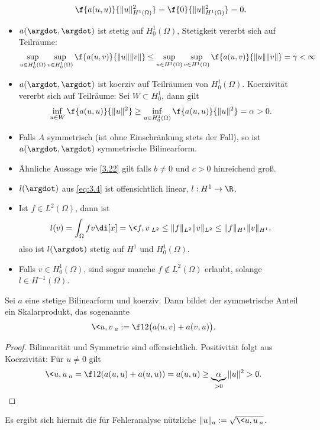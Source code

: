 \begin{st}[Stetigkeit und Koerzivität, $b=0$, $c = 0$]
\begin{note}
\begin{itemize}
				\[
					\f{a(u,u)}{\|u\|_{H^1(\Omega)}^2}
					= \f{0}{\|u\|_{H^1(\Omega)}^2}
					= 0.
				\]
			\item
				$a(\argdot, \argdot)$ ist stetig auf $H_0^1(\Omega)$, Stetigkeit vererbt sich auf Teilräume:
				\begin{align*}
					\sup_{u \in H_0^1(\Omega)} \sup_{v \in H_0^1(\Omega)} \f{a(u,v)}{\|u\|\|v\|}
					\le \sup_{u \in H^1(\Omega)} \sup_{v \in H^1(\Omega)} \f{a(u,v)}{\|u\|\|v\|}
					= \gamma < \infty
				\end{align*}
			\item
				$a(\argdot, \argdot)$ ist koerziv auf Teilräumen von $H_0^1(\Omega)$.
				Koerzivität vererbt sich auf Teilräume:
				Sei $W \subset H_0^1$, dann gilt
				\[
					\inf_{u \in W} \f{a(u,u)}{\|u\|^2}
					\ge \inf_{u \in H_0^1(\Omega)} \f{a(u,u)}{\|u\|^2}
					= \alpha
					> 0.
				\]
			\item
				Falls $A$ symmetrisch (ist ohne Einschränkung stets der Fall), so ist $a(\argdot, \argdot)$ symmetrische Bilinearform.
			\item
				Ähnliche Aussage wie \ref{3.22} gilt falls $b \neq 0$ und $c > 0$ hinreichend groß.
		\end{itemize}
	\end{note}
\end{st}

\begin{note}
	\begin{itemize}
		\item
			$l(\argdot)$ aus \eqref{eq:3.4} ist offensichtlich linear, $l: H^1 \to \R$.
		\item
			Ist $f \in L^2(\Omega)$, dann ist
			\[
				l(v) = \int_\Omega fv \di[x]
				= \<f, v \>_{L^2}
				\le \|f\|_{L^2} \|v\|_{L^2}
				\le \|f\|_{H^1}\|v\|_{H^1},
			\]
			also ist $l(\argdot)$ stetig auf $H^1$ und $H_0^1(\Omega)$.
		\item
			Falls $v \in H_0^1(\Omega)$, sind sogar manche $f \not\in L^2(\Omega)$ erlaubt, solange $l \in H^{-1}(\Omega)$.
	\end{itemize}
\end{note}


\begin{df} \label{3.23}
	Sei $a$ eine stetige Bilinearform und koerziv.
	Dann bildet der symmetrische Anteil ein Skalarprodukt, das sogenannte 
	\[
		\<u,v\>_a :=  \f 12\big(a(u,v) + a(v,u)\big).
	\]
	\begin{proof}
		Bilinearität und Symmetrie sind offensichtlich.
		Positivität folgt aus Koerzivität:
		Für $u \neq 0$ gilt
		\[
			\<u,u\>_a
			= \f 12 (a(u,u) + a(u,u))
			= a(u,u)
			\ge \underbrace{\alpha}_{>0} \|u\|^2
			> 0.
		\]
	\end{proof}
	\begin{note}
		Es ergibt sich hiermit die für Fehleranalyse nützliche  $\|u\|_a := \sqrt{\<u,u\>_a}$.
	\end{note}
\end{df}

